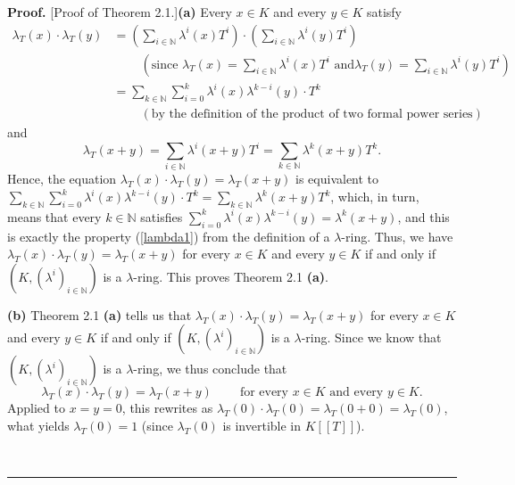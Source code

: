 \documentclass[numbers=enddot,12pt,final,onecolumn,notitlepage]{scrartcl}%
\newenvironment{proof}[1][Proof]{\noindent\textbf{#1.} }{\ \rule{0.5em}{0.5em}}
\begin{document}
\begin{proof}
[Proof of Theorem 2.1.]\textbf{(a)} Every $x\in K$ and every $y\in K$ satisfy%
\begin{align*}
\lambda_{T}\left(  x\right)  \cdot\lambda_{T}\left(  y\right)   &  =\left(
\sum\limits_{i\in\mathbb{N}}\lambda^{i}\left(  x\right)  T^{i}\right)
\cdot\left(  \sum\limits_{i\in\mathbb{N}}\lambda^{i}\left(  y\right)
T^{i}\right) \\
&  \ \ \ \ \ \ \ \ \ \ \left(  \text{since }\lambda_{T}\left(  x\right)
=\sum\limits_{i\in\mathbb{N}}\lambda^{i}\left(  x\right)  T^{i}\text{ and
}\lambda_{T}\left(  y\right)  =\sum\limits_{i\in\mathbb{N}}\lambda^{i}\left(
y\right)  T^{i}\right) \\
&  =\sum_{k\in\mathbb{N}}\sum_{i=0}^{k}\lambda^{i}\left(  x\right)
\lambda^{k-i}\left(  y\right)  \cdot T^{k}\\
&  \ \ \ \ \ \ \ \ \ \ \left(  \text{by the definition of the product of two
formal power series}\right)
\end{align*}
and%
\[
\lambda_{T}\left(  x+y\right)  =\sum_{i\in\mathbb{N}}\lambda^{i}\left(
x+y\right)  T^{i}=\sum_{k\in\mathbb{N}}\lambda^{k}\left(  x+y\right)  T^{k}.
\]
Hence, the equation $\lambda_{T}\left(  x\right)  \cdot\lambda_{T}\left(
y\right)  =\lambda_{T}\left(  x+y\right)  $ is equivalent to $\sum
\limits_{k\in\mathbb{N}}\sum\limits_{i=0}^{k}\lambda^{i}\left(  x\right)
\lambda^{k-i}\left(  y\right)  \cdot T^{k}=\sum\limits_{k\in\mathbb{N}}%
\lambda^{k}\left(  x+y\right)  T^{k}$, which, in turn, means that every
$k\in\mathbb{N}$ satisfies $\sum\limits_{i=0}^{k}\lambda^{i}\left(  x\right)
\lambda^{k-i}\left(  y\right)  =\lambda^{k}\left(  x+y\right)  $, and this is
exactly the property (\ref{lambda1}) from the definition of a $\lambda$-ring.
Thus, we have $\lambda_{T}\left(  x\right)  \cdot\lambda_{T}\left(  y\right)
=\lambda_{T}\left(  x+y\right)  $ for every $x\in K$ and every $y\in K$ if and
only if $\left(  K,\left(  \lambda^{i}\right)  _{i\in\mathbb{N}}\right)  $ is
a $\lambda$-ring. This proves Theorem 2.1 \textbf{(a)}.

\textbf{(b)} Theorem 2.1 \textbf{(a)} tells us that $\lambda_{T}\left(
x\right)  \cdot\lambda_{T}\left(  y\right)  =\lambda_{T}\left(  x+y\right)  $
for every $x\in K$ and every $y\in K$ if and only if $\left(  K,\left(
\lambda^{i}\right)  _{i\in\mathbb{N}}\right)  $ is a $\lambda$-ring. Since we
know that $\left(  K,\left(  \lambda^{i}\right)  _{i\in\mathbb{N}}\right)  $
is a $\lambda$-ring, we thus conclude that
\begin{equation}
\lambda_{T}\left(  x\right)  \cdot\lambda_{T}\left(  y\right)  =\lambda
_{T}\left(  x+y\right)  \ \ \ \ \ \ \ \ \ \ \text{for every }x\in K\text{ and
every }y\in K. \label{2.1.pf.1}%
\end{equation}
Applied to $x=y=0$, this rewrites as $\lambda_{T}\left(  0\right)
\cdot\lambda_{T}\left(  0\right)  =\lambda_{T}\left(  0+0\right)  =\lambda
_{T}\left(  0\right)  $, what yields $\lambda_{T}\left(  0\right)  =1$ (since
$\lambda_{T}\left(  0\right)  $ is invertible in $K\left[  \left[  T\right]
\right]  $).


\end{proof}
\end{document}
